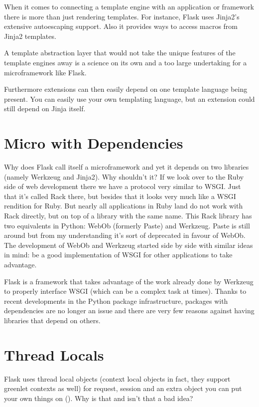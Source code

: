 \documentclass[a4paper,12pt]{sphinxmanual}
\begin{document}
When it comes to connecting a template engine with an application or
framework there is more than just rendering templates.  For instance,
Flask uses Jinja2's extensive autoescaping support.  Also it provides
ways to access macros from Jinja2 templates.

A template abstraction layer that would not take the unique features of
the template engines away is a science on its own and a too large
undertaking for a microframework like Flask.

Furthermore extensions can then easily depend on one template language
being present.  You can easily use your own templating language, but an
extension could still depend on Jinja itself.


\section{Micro with Dependencies}
\label{design:micro-with-dependencies}
Why does Flask call itself a microframework and yet it depends on two
libraries (namely Werkzeug and Jinja2).  Why shouldn't it?  If we look
over to the Ruby side of web development there we have a protocol very
similar to WSGI.  Just that it's called Rack there, but besides that it
looks very much like a WSGI rendition for Ruby.  But nearly all
applications in Ruby land do not work with Rack directly, but on top of a
library with the same name.  This Rack library has two equivalents in
Python: WebOb (formerly Paste) and Werkzeug.  Paste is still around but
from my understanding it's sort of deprecated in favour of WebOb.  The
development of WebOb and Werkzeug started side by side with similar ideas
in mind: be a good implementation of WSGI for other applications to take
advantage.

Flask is a framework that takes advantage of the work already done by
Werkzeug to properly interface WSGI (which can be a complex task at
times).  Thanks to recent developments in the Python package
infrastructure, packages with dependencies are no longer an issue and
there are very few reasons against having libraries that depend on others.


\section{Thread Locals}
\label{design:thread-locals}
Flask uses thread local objects (context local objects in fact, they
support greenlet contexts as well) for request, session and an extra
object you can put your own things on ({\hyperref[api:flask.g]{}}).  Why is that and
isn't that a bad idea?
\end{document}
